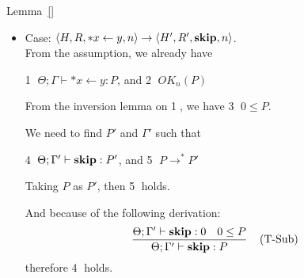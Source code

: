\begin{pfof}{Lemma~\ref{}}
\begin{itemize}
By the inversion lemma on \textcircled{1}, we have
\begin{center}
\textcircled{3} $\Theta; \Gamma \vdash s_{1} : P_{1}$, and \textcircled{4} $0;P_{1} \le P $
\end{center}

We need to prove that there exists $P'$ and $\Gamma'$ such that
\begin{center}
\textcircled{5} $\Theta; \Gamma' \vdash s_{1} : P'$, and \textcircled{6} $P \rightarrow^{*} P'$
\end{center}

By the definition of subtyping and $0;P_{1} \rightarrow P_{1}$, then we get that $\exists P''$
\begin{center}
 \textcircled{7} $P \rightarrow^{*} P''$, and \textcircled{8} $P_{1} \le P''$
\end{center}

Taking $P''$ as  $P'$, we get $P \rightarrow^{*} P'$

And by using rule T-Sub with premises $\Gamma \vdash s_{1} : P_{1}$ and $P_{1} \le P''$, then we have 
$$
    \frac{\Theta; \Gamma \vdash s_{1} : P_{1} \  \  P_{1} \le P''}
    {\Gamma \vdash s_{1} : P''}
    \Rtab \mbox{(T-Sub)}
$$

Therefore, we prove that $\Gamma \vdash s_{1} : P'$ \\

\item Case: $\langle H, R, *x \leftarrow y , n \rangle \rightarrow  \langle H', R', \mathbf{skip}, n  \rangle $. \\

From the assumption, we already have
\begin{center}
\textcircled{1} $\Theta; \Gamma \vdash *x \leftarrow y : P$, and \textcircled{2} $OK_{n}(P)$
\end{center}

From the inversion lemma on \textcircled{1}, we have \textcircled{3} $0 \le P$.

We need to find $P'$ and $\Gamma'$ such that
\begin{center}
 \textcircled{4} $\Theta; \Gamma' \vdash \mathbf{skip}: P'$, and \textcircled{5} $P \rightarrow^{*} P'$
\end{center}

Taking $P$ as $P'$, then \textcircled{5} holds.

And because of the following derivation:
$$
  \frac{\Theta; \Gamma' \vdash \mathbf{skip}: 0 \ \ \ 0 \le P}
   {\Theta;\Gamma' \vdash \mathbf{skip} : P}
  \; \; \; \; \mbox{(T-Sub)}
$$
therefore \textcircled{4} holds. \\


\end{itemize}
\end{pfof}
